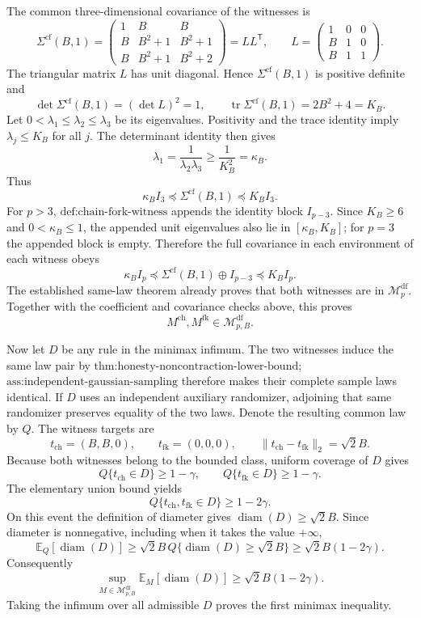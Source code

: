The common three-dimensional covariance of the witnesses is
\[
\Sigma^{\mathrm{cf}}(B,1)
=
\begin{pmatrix}
1&B&B\\
B&B^2+1&B^2+1\\
B&B^2+1&B^2+2
\end{pmatrix}
=LL^{\mathsf T},
\qquad
L=
\begin{pmatrix}
1&0&0\\
B&1&0\\
B&1&1
\end{pmatrix}.
\]
The triangular matrix \(L\) has unit diagonal.  Hence \(\Sigma^{\mathrm{cf}}(B,1)\) is positive definite and
\[
\det\Sigma^{\mathrm{cf}}(B,1)=(\det L)^2=1,
\qquad
\operatorname{tr}\Sigma^{\mathrm{cf}}(B,1)=2B^2+4=K_B.
\]
Let \(0<\lambda_1\le\lambda_2\le\lambda_3\) be its eigenvalues.  Positivity and the trace identity imply \(\lambda_j\le K_B\) for all \(j\).  The determinant identity then gives
\[
\lambda_1=\frac{1}{\lambda_2\lambda_3}
\ge\frac{1}{K_B^2}=\kappa_B.
\]
Thus
\[
\kappa_B I_3\preceq\Sigma^{\mathrm{cf}}(B,1)
\preceq K_B I_3.
\]
For \(p>3\), \(\text{def:chain-fork-witness}\) appends the identity block \(I_{p-3}\).  Since \(K_B\ge6\) and \(0<\kappa_B\le1\), the appended unit eigenvalues also lie in \([\kappa_B,K_B]\); for \(p=3\) the appended block is empty.  Therefore the full covariance in each environment of each witness obeys
\[
\kappa_B I_p\preceq
\Sigma^{\mathrm{cf}}(B,1)\oplus I_{p-3}
\preceq K_B I_p.
\]
The established same-law theorem already proves that both witnesses are in \(\mathcal M_p^{\mathrm{df}}\).  Together with the coefficient and covariance checks above, this proves
\[
M^{\mathrm{ch}},M^{\mathrm{fk}}
\in\mathcal M_{p,B}^{\mathrm{df}}.
\]

Now let \(D\) be any rule in the minimax infimum.  The two witnesses induce the same law pair by \(\text{thm:honesty-noncontraction-lower-bound}\); \(\text{ass:independent-gaussian-sampling}\) therefore makes their complete sample laws identical.  If \(D\) uses an independent auxiliary randomizer, adjoining that same randomizer preserves equality of the two laws.  Denote the resulting common law by \(Q\).  The witness targets are
\[
t_{\mathrm{ch}}=(B,B,0),
\qquad
t_{\mathrm{fk}}=(0,0,0),
\qquad
\|t_{\mathrm{ch}}-t_{\mathrm{fk}}\|_2=\sqrt2 B.
\]
Because both witnesses belong to the bounded class, uniform coverage of \(D\) gives
\[
Q\{t_{\mathrm{ch}}\in D\}\ge1-\gamma,
\qquad
Q\{t_{\mathrm{fk}}\in D\}\ge1-\gamma.
\]
The elementary union bound yields
\[
Q\{t_{\mathrm{ch}},t_{\mathrm{fk}}\in D\}
\ge1-2\gamma.
\]
On this event the definition of diameter gives \(\operatorname{diam}(D)\ge\sqrt2 B\).  Since diameter is nonnegative, including when it takes the value \(+\infty\),
\[
\mathbb E_Q[\operatorname{diam}(D)]
\ge \sqrt2 B\,
Q\{\operatorname{diam}(D)\ge\sqrt2 B\}
\ge\sqrt2 B(1-2\gamma).
\]
Consequently
\[
\sup_{M\in\mathcal M_{p,B}^{\mathrm{df}}}
\mathbb E_M[\operatorname{diam}(D)]
\ge\sqrt2 B(1-2\gamma).
\]
Taking the infimum over all admissible \(D\) proves the first minimax inequality.

